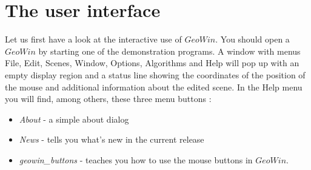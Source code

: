 \section{The user interface}

Let us first have a look at the interactive use of $GeoWin$. You should open a $GeoWin$ by starting
one of the demonstration programs. A window with menus File, Edit, Scenes, Window, Options,
Algorithms and Help will pop up with an empty display region and a status line showing 
the coordinates of the position of the mouse and additional information about the edited scene.
In the Help menu you will find, among others, these three menu buttons :

\begin{itemize}
\item {\em About}    - a simple about dialog
\item {\em News}     - tells you what's new in the current release
\item {\em geowin\_buttons}  - teaches you how to use the mouse buttons in $GeoWin$.
\end{itemize}

